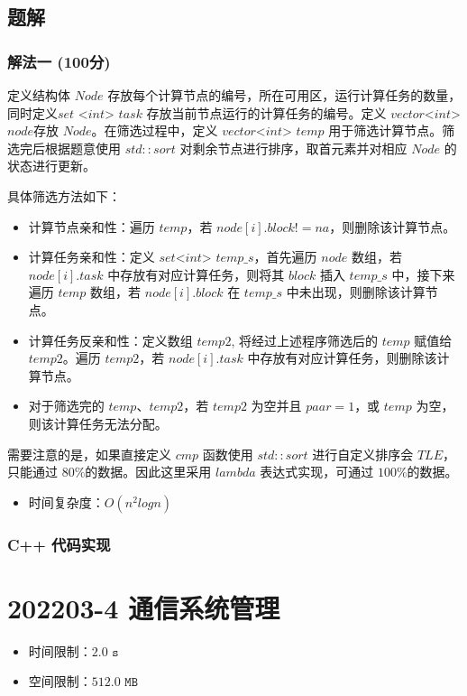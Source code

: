 \documentclass[UTF8, 12pt, a4paper, oneside]{ctexart}
\begin{document}
\subsection{题解}
\subsubsection{解法一 (100分)}
\par 定义结构体 $Node$ 存放每个计算节点的编号，所在可用区，运行计算任务的数量，同时定义$set$ <$int$> $task$ 存放当前节点运行的计算任务的编号。定义 $vector$<$int$> $node$存放 $Node$。在筛选过程中，定义 $vector$<$int$> $temp$ 用于筛选计算节点。筛选完后根据题意使用 $std::sort$ 对剩余节点进行排序，取首元素并对相应 $Node$ 的状态进行更新。
\par 具体筛选方法如下：
\begin{itemize}
    \item 计算节点亲和性：遍历 $temp$，若 $node[i].block != na$，则删除该计算节点。
    \item 计算任务亲和性：定义 $set$<$int$> $temp\_s$，首先遍历 $node$ 数组，若 $node[i].task$ 中存放有对应计算任务，则将其 $block$ 插入 $temp\_s$ 中，接下来遍历 $temp$ 数组，若 $node[i].block$ 在 $temp\_s$ 中未出现，则删除该计算节点。
    \item 计算任务反亲和性：定义数组 $temp2$, 将经过上述程序筛选后的 $temp$ 赋值给 $temp2$。遍历 $temp2$，若 $node[i].task$ 中存放有对应计算任务，则删除该计算节点。
    \item 对于筛选完的 $temp、temp2$，若 $temp2$ 为空并且 $paar=1$，或 $temp$ 为空，则该计算任务无法分配。
\end{itemize}
\par 需要注意的是，如果直接定义 $cmp$ 函数使用 $std::sort$ 进行自定义排序会 $TLE$，只能通过 $80\%$的数据。因此这里采用 $lambda$ 表达式实现，可通过 $100\%$的数据。
\begin{itemize}
    \item 时间复杂度：$O(n^2logn)$
\end{itemize}
\subsubsection{C++ 代码实现}



\section{202203-4 通信系统管理}
\begin{itemize}
    \item 时间限制：$2.0\texttt{ s}$
    \item 空间限制：$512.0\texttt{ MB}$
\end{itemize}
\end{document}
